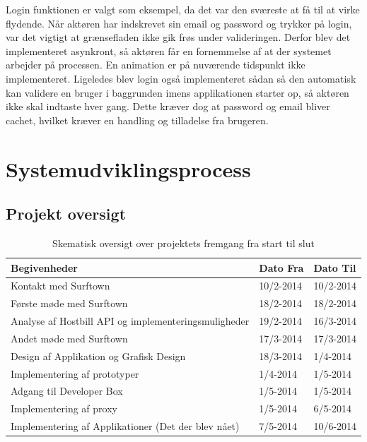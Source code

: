 \documentclass[12pt]{article}
\begin{document}
Login funktionen er valgt som eksempel, da det var den sværeste at få til at virke flydende. Når aktøren har indskrevet sin email og password og trykker på login, var det vigtigt at grænsefladen ikke gik frøs under valideringen. Derfor blev det implementeret asynkront, så aktøren får en fornemmelse af at der systemet arbejder på processen. En animation er på nuværende tidspunkt ikke implementeret. Ligeledes blev login også implementeret sådan så den automatisk kan validere en bruger i baggrunden imens applikationen starter op, så aktøren ikke skal indtaste hver gang. Dette kræver dog at password og email bliver cachet, hvilket kræver en handling og tilladelse fra brugeren.  

\newpage
\section{Systemudviklingsprocess}

\subsection{Projekt oversigt}

\begin{table}[h]
    \begin{tabular}{|l |l |l|}
	\hline
    \textbf{Begivenheder} & \textbf{Dato Fra} & \textbf{Dato Til}   \\
	\hline
    Kontakt med Surftown  & 10/2-2014 & 10/2-2014 \\
	\hline
    Første møde med Surftown & 18/2-2014 & 18/2-2014 \\
	\hline
    Analyse af Hostbill API og implementeringsmuligheder & 19/2-2014 & 16/3-2014 \\
	\hline
  Andet møde med Surftown & 17/3-2014 & 17/3-2014 \\
	\hline
    Design af Applikation og Grafisk Design & 18/3-2014 & 1/4-2014  \\
	\hline
    Implementering af prototyper  & 1/4-2014  & 1/5-2014  \\
	\hline
    Adgang til Developer Box & 1/5-2014  & 1/5-2014  \\
	\hline
    Implementering af proxy  & 1/5-2014  & 6/5-2014  \\
	\hline
    Implementering af Applikationer (Det der blev nået) & 7/5-2014  & 10/6-2014 \\
	\hline
    \end{tabular}
\caption{Skematisk oversigt over projektets fremgang fra start til slut}
\end{table}
\end{document}
